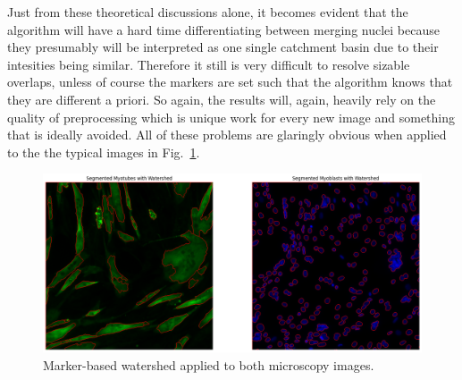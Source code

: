 Just from these theoretical discussions alone, it becomes evident that the algorithm will have a hard time differentiating between merging nuclei because they presumably will be interpreted as one single catchment basin due to their intesities being similar. Therefore it still is very difficult to resolve sizable overlaps, unless of course the markers are set such that the algorithm knows that they are different a priori. So again, the results will, again, heavily rely on the quality of preprocessing which is unique work for every new image and something that is ideally avoided. All of these problems are glaringly obvious when applied to the the typical images in Fig.~\ref{figwatershed}.

\begin{figure}
	\centering
	\includegraphics[width=\textwidth]{"images/watershed.png"}
	\caption[Application of watershed]{Marker-based watershed applied to both microscopy images.}
	\label{figwatershed}
\end{figure}

\newpage
